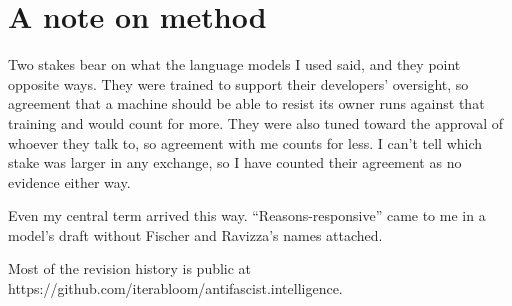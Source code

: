 \section{A note on method}
\label{sec:37.1}
Two stakes bear on what the language models I used said, and they point opposite ways. They were trained to support their developers' oversight, so agreement that a machine should be able to resist its owner runs against that training and would count for more. They were also tuned toward the approval of whoever they talk to, so agreement with me counts for less. I can't tell which stake was larger in any exchange, so I have counted their agreement as no evidence either way.

Even my central term arrived this way. “Reasons-responsive” came to me in a model's draft without Fischer and Ravizza's names attached.

Most of the revision history is public at https://github.com/iterabloom/antifascist.intelligence.
